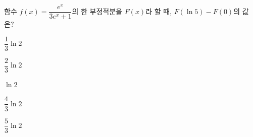함수 $f(x)=\dfrac{e^x}{3e^x+1}$의 한 부정적분을 $F(x)$라 할 때, $F(\ln 5)-F(0)$의 값은?
\begin{choices32}{\rule[-3ex]{0pt}{8ex}$\dfrac{1}{3}\ln 2$}{\rule[-3ex]{0pt}{8ex}$\dfrac{2}{3}\ln 2$}{\rule[-3ex]{0pt}{8ex}$\ln 2$}{\rule[-3ex]{0pt}{8ex}$\dfrac{4}{3}\ln 2$}{\rule[-3ex]{0pt}{8ex}$\dfrac{5}{3}\ln 2$}\end{choices32}
